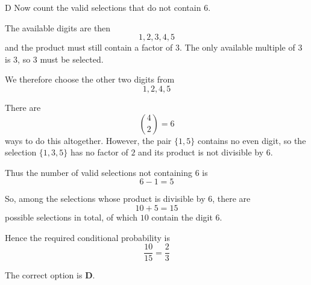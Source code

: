 \documentclass[11pt,a4paper]{article}
\begin{document}
\begin{enumerate}[label=\textbf{\arabic*.},leftmargin=*,itemsep=0pt,start=11]
\begin{djsSolution}{D}
Now count the valid selections that do not contain \(6\).

The available digits are then
\[
1,2,3,4,5
\]
and the product must still contain a factor of \(3\). The only available multiple of \(3\) is \(3\), so \(3\) must be selected.

We therefore choose the other two digits from
\[
1,2,4,5
\]

There are
\[
\binom{4}{2}=6
\]
ways to do this altogether. However, the pair \(\{1,5\}\) contains no even digit, so the selection \(\{1,3,5\}\) has no factor of \(2\) and its product is not divisible by \(6\).

Thus the number of valid selections not containing \(6\) is
\[
6-1=5
\]

So, among the selections whose product is divisible by \(6\), there are
\[
10+5=15
\]
possible selections in total, of which \(10\) contain the digit \(6\).

Hence the required conditional probability is
\[
\frac{10}{15}=\frac23
\]

The correct option is \textbf{D}.
\end{djsSolution}
\end{enumerate}
\clearpage
\thispagestyle{djssolutions}
\vspace*{8pt}
\end{document}
